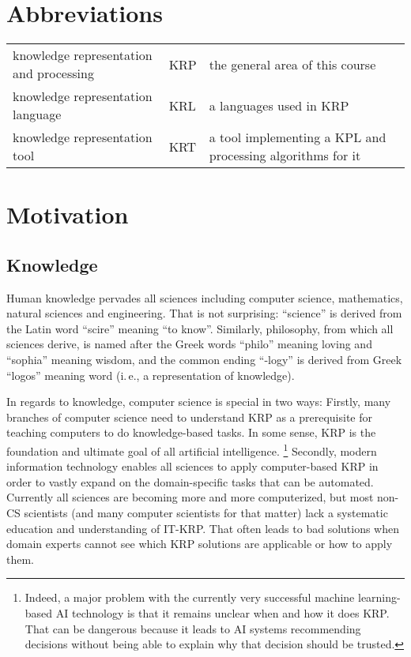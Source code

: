 \section{Abbreviations}

\begin{center}
\begin{tabular}{lll}
knowledge representation and processing & KRP & the general area of this course \\
knowledge representation language & KRL & a languages used in KRP \\
knowledge representation tool & KRT & a tool implementing a KPL and processing algorithms for it
\end{tabular}
\end{center}

\section{Motivation}

\subsection{Knowledge}

Human knowledge pervades all sciences including computer science, mathematics, natural sciences and engineering.
That is not surprising: \enquote{science} is derived from the Latin word \enquote{scire} meaning \enquote{to know}.
Similarly, philosophy, from which all sciences derive, is named after the Greek words \enquote{philo} meaning loving and \enquote{sophia} meaning wisdom, and the common ending \enquote{-logy} is derived from Greek \enquote{logos} meaning word (i.\,e., a representation of knowledge).

In regards to knowledge, computer science is special in two ways:
Firstly, many branches of computer science need to understand KRP as a prerequisite for teaching computers to do knowledge-based tasks.
In some sense, KRP is the foundation and ultimate goal of all artificial intelligence.%
\footnote{Indeed, a major problem with the currently very successful machine learning-based AI technology is that it remains unclear when and how it does KRP. That can be dangerous because it leads to AI systems recommending decisions without being able to explain why that decision should be trusted.}
Secondly, modern information technology enables all sciences to apply computer-based KRP in order to vastly expand on the domain-specific tasks that can be automated.
Currently all sciences are becoming more and more computerized, but most non-CS scientists (and many computer scientists for that matter) lack a systematic education and understanding of IT-KRP.
That often leads to bad solutions when domain experts cannot see which KRP solutions are applicable or how to apply them.


